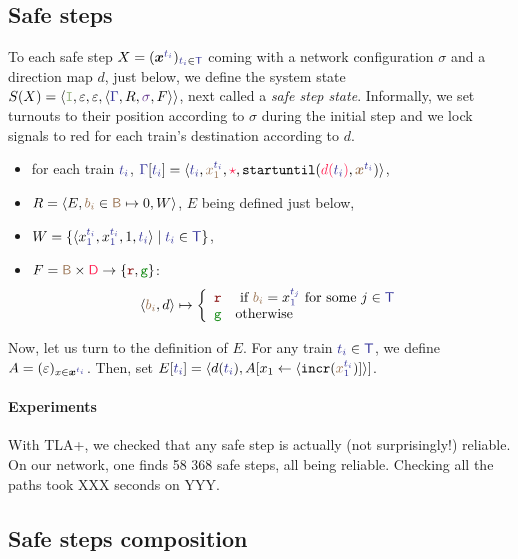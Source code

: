 \documentclass[runningheads]{llncs}
\newcommand{\tuple}[1]{\ensuremath{\langle #1\rangle}}
\newcommand{\directions}{\dirFmt{\mathsf{D}}}
\newcommand{\dirFmt}[1]{{\color{dircolor} #1}}
\newcommand{\dirStop}{\ensuremath{\dirFmt{\star}}\xspace}
\newcommand{\posFmt}[1]{{\color{poscolor}{#1}}}
\newcommand{\blocks}{{\posFmt{\mathsf{B}}}}
\newcommand{\bid}[1]{\ensuremath{\posFmt{b_{#1}}}}
\newcommand{\swFmt}[1]{{\color{swcolor}{#1}}}
\newcommand{\switches}{\ensuremath{\swFmt{\sigma}}}
\newcommand{\trainFmt}[1]{{\color{traincolor} #1}}
\newcommand{\trainTuple}[4]{\langle \trainFmt{#1}, \posFmt{#2}, \dirFmt{#3}, #4 \rangle}
\newcommand{\trainSeq}{\ensuremath{\trainFmt{\Gamma}}\xspace}
\newcommand{\trains}{{\trainFmt{\mathsf{T}}}}
\newcommand{\tid}[1]{\ensuremath{\trainFmt{t_{#1}}}}
\newcommand{\su}[2]{{\mbox{$\mathtt{startuntil}(\dirFmt{#1}, \posFmt{#2})$}}\xspace}
\newcommand{\incr}[1]{{\mbox{\ensuremath{\mathtt{incr}(\posFmt{#1})}}}\xspace}
\newcommand{\regulator}{\ensuremath{R}}
\newcommand{\sigred}{{\mbox{${\color{red!50!black}\mathtt{r}}$}}\xspace}
\newcommand{\siggreen}{{\mbox{${\color{green!50!black}\mathtt{g}}$}}\xspace}
\newcommand{\signals}{\ensuremath{F}}
\newcommand{\stateTuple}[4]{\tuple{#1, #2, #3, #4}}
\newcommand{\guardFmt}[1]{{\color{guardcolor} \ensuremath{\mathtt{#1}}}}
\newcommand{\guardI}{\guardFmt{I}}
\newcommand{\bufferFmt}[1]{#1}
\newcommand{\emptyList}{\ensuremath{\varepsilon}}
\newcommand{\redTuple}[4]{\ensuremath{\tuple{#1, \bufferFmt{#2}, \bufferFmt{#3}, #4}}}
\begin{document}
\subsection{Safe steps}
\label{sec:experiments:4}

To each safe step $X = (\vec{x}^{\tid{i}})_{\tid{i} \in \trains}$ coming with a network configuration $\sigma$ and a direction map $d$, just below, we define the system state $S(X) = \redTuple{\guardI}{ \emptyList}{ \emptyList}{\stateTuple{\trainSeq{}}{\regulator}{\switches}{\signals}}$, next called a \emph{safe step state}. Informally, we set turnouts to their position according to $\sigma$ during the initial step  and we lock signals to red for each train's destination according to $d$. 
\begin{itemize}
\item for each train $\tid{i}$, $\trainSeq[\tid{i}] = \trainTuple{\tid{i}}{x_1^{\tid{i}}}{\dirStop}{\su{d(\tid{i})}{\vec{x}^{\tid{i}}}}$,
\item $R = \langle E,  \bid{i} \in \blocks \mapsto 0, W\rangle$, $E$ being defined just below,
\item $W = \{ \tuple{x_1^\tid{i}, x_1^\tid{i}, 1, \tid{i}}  \mid \tid{i} \in \trains \}$, 
\item $F = \blocks \times \directions \to \{\sigred, \siggreen \}$: 
$$\langle \bid{i}, d\rangle \mapsto \left \{ \begin{array}{ll}
\sigred & \text{ if } \bid{i} = x_1^\tid{j}  \text{ for some }j \in \trains\\%
\siggreen & \text{otherwise}
\end{array}\right.
$$
\end{itemize}

Now, let us turn to the definition of $E$. For any train $\tid{i} \in \trains$, we define $A= (\emptyList)_{x \in \vec{x}^\tid{i} }$. Then, set  $E[\tid{i}] = \langle d(\tid{i}), A[x_1 \leftarrow \langle \incr{x_1^\tid{i}}] \rangle]$. 

\paragraph{Experiments}  With TLA+, we checked that any safe step is actually (not surprisingly!) reliable.  On our network, one finds 58 368 safe steps, all being reliable. Checking all the paths took XXX seconds on YYY. 

\subsection{Safe steps composition}
\end{document}
